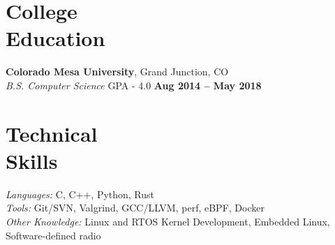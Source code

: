 \documentclass[margin,line]{resume}
\begin{document}
\begin{resume}
\iffalse
    \textbf{Auto Chess}\\
    Designed a self-contained autonomous chess board with integration with popular chess websites.

    \begin{itemize}
        \item Designed and integrated PCB's for detection and management of board state.
        \item Integrated web API's for play against computer engines and online players.
        \item Developed communication protocols for control of real-time subsystems from an embedded
              Linux platform.
    \end{itemize}
\fi

    \section{\mysidestyle College\\Education}

    \textbf{Colorado Mesa University}, Grand Junction, CO \vspace{1mm}\\\vspace{1mm}%
    \textsl{B.S. Computer Science} GPA - 4.0 \hfill \textbf{Aug 2014 -- May 2018}

    \section{\mysidestyle Technical\\Skills}

    \emph{Languages:} C, C++, Python, Rust\\
    \emph{Tools:} Git/SVN, Valgrind, GCC/LLVM, perf, eBPF, Docker\\
    \emph{Other Knowledge:} Linux and RTOS Kernel Development, Embedded Linux, Software-defined radio\\
\end{resume}
\end{document}

